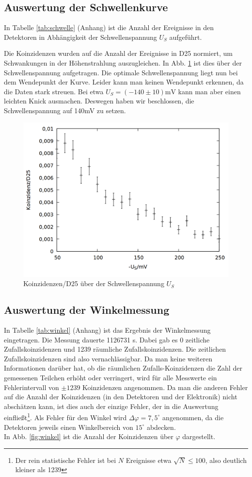 \subsection{Auswertung der Schwellenkurve}
In Tabelle \ref{tab:schwelle} (Anhang) ist die Anzahl der Ereignisse in den Detektoren in Abhängigkeit der Schwellenspannung $U_S$ aufgeführt. 

Die Koinzidenzen wurden auf die Anzahl der Ereignisse in D25 normiert, um Schwankungen in der Höhenstrahlung auszugleichen. In Abb. \ref{fig:schwelle} ist dies über der Schwellenspannung aufgetragen. Die optimale Schwellenspannung liegt nun bei dem Wendepunkt der Kurve. Leider kann man keinen Wendepunkt erkennen, da die Daten stark streuen. Bei etwa $U_S = (-140 \pm 10)\si{\milli \volt}$ kann man aber einen leichten Knick ausmachen. Deswegen haben wir beschlossen, die Schwellenspannung auf 140\si{\milli \volt} zu setzen.

\begin{figure}
\centering
\includegraphics[width=0.75\linewidth]{data/friedrich/schwelle.png}
\caption{Koinzidenzen/D25 über der Schwellenspannung $U_S$}
\label{fig:schwelle}
\end{figure}

\subsection{Auswertung der Winkelmessung}
In Tabelle \ref{tab:winkel} (Anhang) ist das Ergebnis der Winkelmessung eingetragen. Die Messung dauerte 1126731 \si{\second}. Dabei gab es 0 zeitliche Zufallskoinzidenzen und 1239 räumliche Zufallskoinzidenzen. Die zeitlichen Zufallskoinzidenzen sind also vernachlässigbar. Da man keine weiteren Informationen darüber hat, ob die räumlichen Zufalls-Koinzidenzen die Zahl der gemessenen Teilchen erhöht oder verringert, wird für alle Messwerte ein Fehlerintervall von $\pm 1239$ Koinzidenzen angenommen. Da man die anderen Fehler auf die Anzahl der Koinzidenzen (in den Detektoren und der Elektronik) nicht abschätzen kann, ist dies auch der einzige Fehler, der in die Auswertung einfließt\footnote{Der rein statistische Fehler ist bei $N$ Ereignisse etwa $\sqrt{N} \leq 100$, also deutlich kleiner als 1239}. Als Fehler für den Winkel wird $\Delta \varphi = 7,5^\circ$ angenommen, da die Detektoren jeweils einen Winkelbereich von $15^\circ$ abdecken.\\ 
In Abb. \ref{fig:winkel} ist die Anzahl der Koinzidenzen über $\varphi$ dargestellt.

